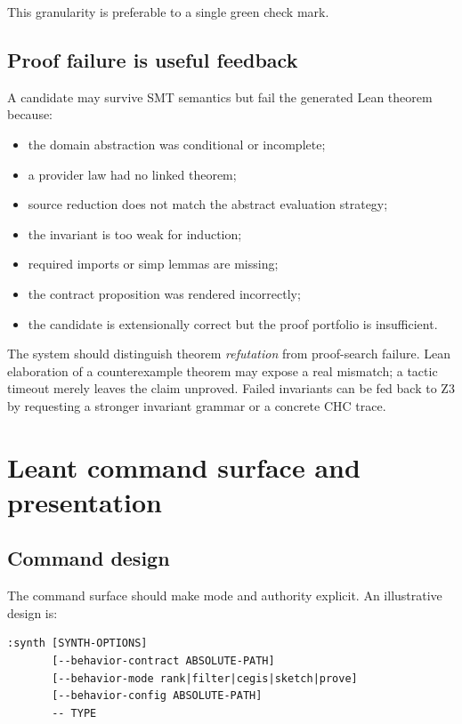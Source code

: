 \documentclass[11pt,oneside]{report}
\begin{document}
This granularity is preferable to a single green check mark.

\section{Proof failure is useful feedback}

A candidate may survive SMT semantics but fail the generated Lean theorem because:

\begin{itemize}[leftmargin=2em]
\item the domain abstraction was conditional or incomplete;
\item a provider law had no linked theorem;
\item source reduction does not match the abstract evaluation strategy;
\item the invariant is too weak for induction;
\item required imports or simp lemmas are missing;
\item the contract proposition was rendered incorrectly;
\item the candidate is extensionally correct but the proof portfolio is insufficient.
\end{itemize}

The system should distinguish theorem \emph{refutation} from proof-search failure. Lean elaboration of a counterexample theorem may expose a real mismatch; a tactic timeout merely leaves the claim unproved. Failed invariants can be fed back to Z3 by requesting a stronger invariant grammar or a concrete CHC trace.


\chapter{Leant command surface and presentation}
\label{chap:ux}

\section{Command design}

The command surface should make mode and authority explicit. An illustrative design is:

\begin{lstlisting}[language={}]
:synth [SYNTH-OPTIONS]
       [--behavior-contract ABSOLUTE-PATH]
       [--behavior-mode rank|filter|cegis|sketch|prove]
       [--behavior-config ABSOLUTE-PATH]
       -- TYPE
\end{lstlisting}
\end{document}
